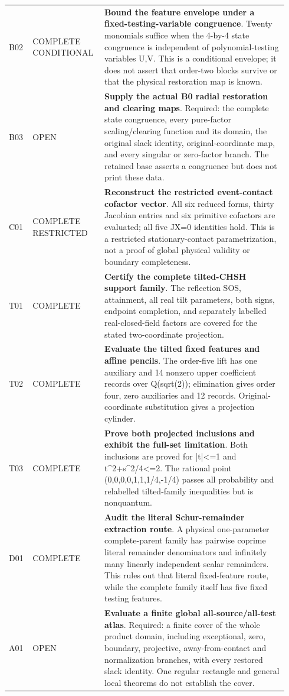 \begin{longtable}{@{}>{\raggedright\arraybackslash}p{0.075\linewidth}>{\raggedright\arraybackslash}p{0.235\linewidth}>{\raggedright\arraybackslash}p{0.63\linewidth}@{}}
B02 & COMPLETE CONDITIONAL & \textbf{Bound the feature envelope under a fixed-testing-variable congruence}. Twenty monomials suffice when the 4-by-4 state congruence is independent of polynomial-testing variables U,V. This is a conditional envelope; it does not assert that order-two blocks survive or that the physical restoration map is known.\\[5pt]
B03 & OPEN & \textbf{Supply the actual B0 radial restoration and clearing maps}. Required: the complete state congruence, every pure-factor scaling/clearing function and its domain, the original slack identity, original-coordinate map, and every singular or zero-factor branch. The retained base asserts a congruence but does not print these data.\\[5pt]
C01 & COMPLETE RESTRICTED & \textbf{Reconstruct the restricted event-contact cofactor vector}. All six reduced forms, thirty Jacobian entries and six primitive cofactors are evaluated; all five JX=0 identities hold. This is a restricted stationary-contact parametrization, not a proof of global physical validity or boundary completeness.\\[5pt]
T01 & COMPLETE & \textbf{Certify the complete tilted-CHSH support family}. The reflection SOS, attainment, all real tilt parameters, both signs, endpoint completion, and separately labelled real-closed-field factors are covered for the stated two-coordinate projection.\\[5pt]
T02 & COMPLETE & \textbf{Evaluate the tilted fixed features and affine pencils}. The order-five lift has one auxiliary and 14 nonzero upper coefficient records over Q(sqrt(2)); elimination gives order four, zero auxiliaries and 12 records. Original-coordinate substitution gives a projection cylinder.\\[5pt]
T03 & COMPLETE & \textbf{Prove both projected inclusions and exhibit the full-set limitation}. Both inclusions are proved for |t|<=1 and t\textasciicircum{}2+s\textasciicircum{}2/4<=2. The rational point (0,0,0,0,1,1,1/4,-1/4) passes all probability and relabelled tilted-family inequalities but is nonquantum.\\[5pt]
D01 & COMPLETE & \textbf{Audit the literal Schur-remainder extraction route}. A physical one-parameter complete-parent family has pairwise coprime literal remainder denominators and infinitely many linearly independent scalar remainders. This rules out that literal fixed-feature route, while the complete family itself has five fixed testing features.\\[5pt]
A01 & OPEN & \textbf{Evaluate a finite global all-source/all-test atlas}. Required: a finite cover of the whole product domain, including exceptional, zero, boundary, projective, away-from-contact and normalization branches, with every restored slack identity. One regular rectangle and general local theorems do not establish the cover.\\[5pt]

\end{longtable}
